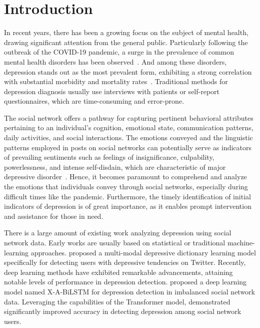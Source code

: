 \documentclass[runningheads]{llncs}
\begin{document}
\section{Introduction}
In recent years, there has been a growing focus on the subject of mental health, drawing significant attention from the general public. Particularly following the outbreak of the COVID-19 pandemic, a surge in the prevalence of common mental health disorders has been observed~\cite{chandola2022mental}. And among these disorders, depression stands out as the most prevalent form, exhibiting a strong correlation with substantial morbidity and mortality rates~\cite{cuijpers2020treatment}. Traditional methods for depression diagnosis usually use interviews with patients or self-report questionnaires, which are time-consuming and error-prone.

The social network offers a pathway for capturing pertinent behavioral attributes pertaining to an individual's cognition, emotional state, communication patterns, daily activities, and social interactions. The emotions conveyed and the linguistic patterns employed in posts on social networks can potentially serve as indicators of prevailing sentiments such as feelings of insignificance, culpability, powerlessness, and intense self-disdain, which are characteristic of major depressive disorder~\cite{de2013predicting}. Hence, it becomes paramount to comprehend and analyze the emotions that individuals convey through social networks, especially during difficult times like the pandemic. Furthermore, the timely identification of initial indicators of depression is of great importance, as it enables prompt intervention and assistance for those in need.

There is a large amount of existing work analyzing depression using social network data. Early works are usually based on statistical or traditional machine-learning approaches. \cite{shen2017depression} proposed a multi-modal depressive dictionary learning model specifically for detecting users with depressive tendencies on Twitter. Recently, deep learning methods have exhibited remarkable advancements, attaining notable levels of performance in depression detection. \cite{cong2018xa} proposed a deep learning model named X-A-BiLSTM for depression detection in imbalanced social network data. Leveraging the capabilities of the Transformer model, \cite{malviya2021transformers} demonstrated significantly improved accuracy in detecting depression among social network users. 
\end{document}
